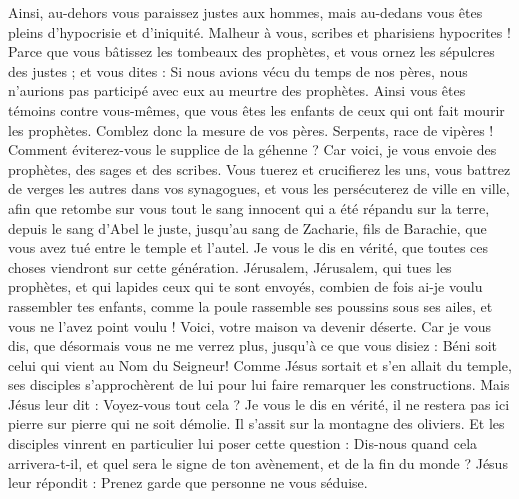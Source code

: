 \begin{multicols}{2}
Ainsi, au-dehors vous paraissez justes aux hommes, mais au-dedans vous êtes pleins d'hypocrisie et d'iniquité.
Malheur à vous, scribes et pharisiens hypocrites ! Parce que vous bâtissez les tombeaux des prophètes, et vous ornez les sépulcres des justes ;
et vous dites : Si nous avions vécu du temps de nos pères, nous n'aurions pas participé avec eux au meurtre des prophètes.
Ainsi vous êtes témoins contre vous-mêmes, que vous êtes les enfants de ceux qui ont fait mourir les prophètes.
Comblez donc la mesure de vos pères.
Serpents, race de vipères ! Comment éviterez-vous le supplice de la géhenne ?
Car voici, je vous envoie des prophètes, des sages et des scribes. Vous tuerez et crucifierez les uns, vous battrez de verges les autres dans vos synagogues, et vous les persécuterez de ville en ville,
afin que retombe sur vous tout le sang innocent qui a été répandu sur la terre, depuis le sang d'Abel le juste, jusqu’au sang de Zacharie, fils de Barachie, que vous avez tué entre le temple et l'autel.
Je vous le dis en vérité, que toutes ces choses viendront sur cette génération.
Jérusalem, Jérusalem, qui tues les prophètes, et qui lapides ceux qui te sont envoyés, combien de fois ai-je voulu rassembler tes enfants, comme la poule rassemble ses poussins sous ses ailes, et vous ne l'avez point voulu !
Voici, votre maison va devenir déserte.
Car je vous dis, que désormais vous ne me verrez plus, jusqu'à ce que vous disiez : Béni soit celui qui vient au Nom du Seigneur{}!
\VerseOne{}Comme Jésus sortait et s'en allait du temple, ses disciples s'approchèrent de lui pour lui faire remarquer les constructions.
Mais Jésus leur dit : Voyez-vous tout cela ? Je vous le dis en vérité, il ne restera pas ici pierre sur pierre qui ne soit démolie.
Il s’assit sur la montagne des oliviers. Et les disciples vinrent en particulier lui poser cette question : Dis-nous quand cela arrivera-t-il, et quel sera le signe de ton avènement, et de la fin du monde ?
Jésus leur répondit : Prenez garde que personne ne vous séduise.

\end{multicols}

